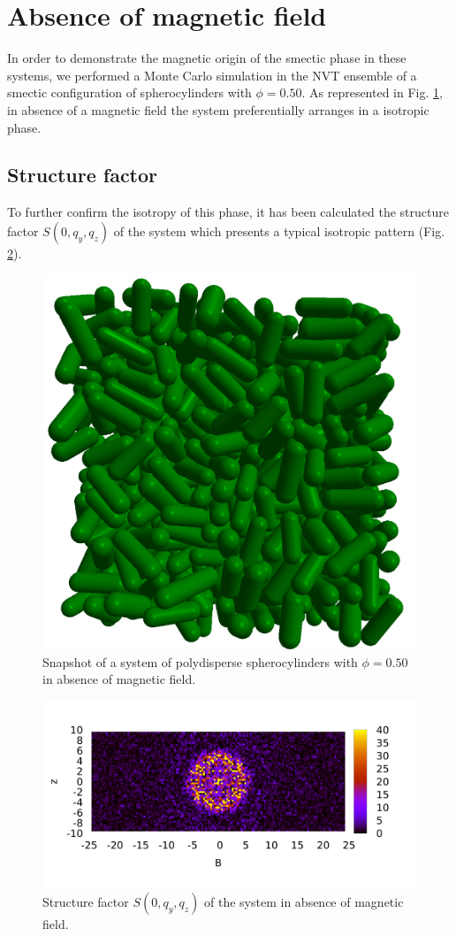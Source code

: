 \documentclass{article}
\begin{document}
\section{Absence of magnetic field}

In order to demonstrate the magnetic origin of the smectic phase in these systems, we performed a Monte Carlo simulation in the NVT ensemble of a smectic configuration of spherocylinders with $\phi = 0.50$. As represented in Fig. \ref{fig:noB_snapshot}, in absence of a magnetic field the system preferentially arranges in a isotropic phase.

\subsection{Structure factor}
To further confirm the isotropy of this phase, it has been calculated the structure factor $S(0, q_y, q_z)$ of the system which presents a typical isotropic pattern (Fig. \ref{fig:Syz_noB}).


\begin{figure}
    \centering
    \includegraphics[width=0.5\columnwidth]{Isotropic_phase_snap.png}
    \caption{Snapshot of a system of polydisperse spherocylinders with $\phi = 0.50$ in absence of magnetic field.}
    \label{fig:noB_snapshot}
\end{figure}

\begin{figure}
    \centering
    \includegraphics[width=1\columnwidth]{Syz_noB.png}
    \caption{Structure factor $S(0, q_y, q_z)$ of the system in absence of magnetic field.}
    \label{fig:Syz_noB}
\end{figure}
\end{document}
